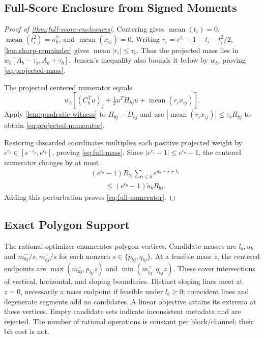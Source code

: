 \FloatBarrier
\subsection{Full-Score Enclosure from Signed Moments}
\label{app:full-score-enclosures}
\begin{proof}[Proof of \cref{thm:full-score-enclosures}]
Centering gives $\operatorname{mean}(t_i)=0$,
$\operatorname{mean}(t_i^2)=\sigma_b^2$, and
$\operatorname{mean}(x_{ij})=0$. Writing
$r_i=e^{t_i}-1-t_i-t_i^2/2$, \cref{lem:sharp-remainder} gives
$\operatorname{mean}|r_i|\le\tau_b$. Thus the projected mass lies in
$w_b[A_b-\tau_b,A_b+\tau_b]$. Jensen's inequality also bounds it below by
$w_b$, proving \cref{eq:projected-mass}.

The projected centered numerator equals
\begin{equation*}
 w_b\left[(C_b^Tu)_j+\tfrac12u^TH_{bj}u+
 \operatorname{mean}(r_i x_{ij})\right].
\end{equation*}
Apply \cref{lem:quadratic-witness} to $H_{bj}-D_{bj}$ and use
$|\operatorname{mean}(r_i x_{ij})|\le\tau_bR_{bj}$ to obtain
\cref{eq:projected-numerator}.

Restoring discarded coordinates multiplies each positive projected weight by
$e^{e_i}\in[e^{-\epsilon_b},e^{\epsilon_b}]$, proving \cref{eq:full-mass}.
Since $|e^{e_i}-1|\le e^{\epsilon_b}-1$, the centered numerator changes by
at most
\begin{equation*}
 \begin{aligned}
 &(e^{\epsilon_b}-1)R_{bj}\sum_{i\in b}e^{a_b-s+t_i}\\
 &\qquad\le(e^{\epsilon_b}-1)\widetilde u_bR_{bj}.
 \end{aligned}
\end{equation*}
Adding this perturbation proves \cref{eq:full-numerator}.
\end{proof}

\FloatBarrier
\subsection{Exact Polygon Support}
\label{app:polygon-support}
The rational optimizer enumerates polygon vertices. Candidate masses are
$l_b,u_b$ and $m^-_{bj}/s,m^+_{bj}/s$ for each nonzero
$s\in\{p_{bj},q_{bj}\}$. At a feasible mass $z$, the centered endpoints are
$\max(m^-_{bj},p_{bj}z)$ and $\min(m^+_{bj},q_{bj}z)$.
These cover intersections of vertical, horizontal, and sloping boundaries.
Distinct sloping lines meet at $z=0$, necessarily a mass endpoint if feasible
under $l_b\ge0$; coincident lines and degenerate segments add no candidates.
A linear objective attains its extrema at these vertices. Empty candidate
sets indicate inconsistent metadata and are rejected. The number of rational
operations is constant per block/channel; their bit cost is not.

